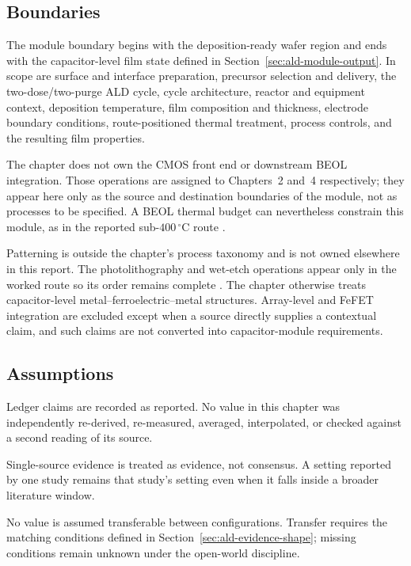 \documentclass[11pt,a4paper]{report}
\begin{document}
\subsection{Boundaries}
\label{sec:ald-boundaries}

The module boundary begins with the deposition-ready wafer region and ends with the capacitor-level film state defined in Section~\ref{sec:ald-module-output}. In scope are surface and interface preparation, precursor selection and delivery, the two-dose/two-purge ALD cycle, cycle architecture, reactor and equipment context, deposition temperature, film composition and thickness, electrode boundary conditions, route-positioned thermal treatment, process controls, and the resulting film properties.

The chapter does not own the CMOS front end or downstream BEOL integration. Those operations are assigned to Chapters~2 and~4 respectively; they appear here only as the source and destination boundaries of the module, not as processes to be specified. A BEOL thermal budget can nevertheless constrain this module, as in the reported sub-$400\,^{\circ}$C route \cite{silva2023road,neuber2022peald}.

Patterning is outside the chapter's process taxonomy and is not owned elsewhere in this report. The photolithography and wet-etch operations appear only in the worked route so its order remains complete \cite{tsai2022stress}. The chapter otherwise treats capacitor-level metal--ferroelectric--metal structures. Array-level and FeFET integration are excluded except when a source directly supplies a contextual claim, and such claims are not converted into capacitor-module requirements.

\subsection{Assumptions}
\label{sec:ald-assumptions}

Ledger claims are recorded as reported. No value in this chapter was independently re-derived, re-measured, averaged, interpolated, or checked against a second reading of its source.

Single-source evidence is treated as evidence, not consensus. A setting reported by one study remains that study's setting even when it falls inside a broader literature window.

No value is assumed transferable between configurations. Transfer requires the matching conditions defined in Section~\ref{sec:ald-evidence-shape}; missing conditions remain unknown under the open-world discipline.
\end{document}
